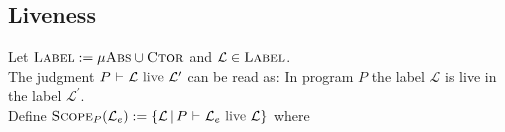 \begin{prooftree}
\end{prooftree}
\vspace*{0.3cm}

\begin{prooftree}
\end{prooftree}
\vspace*{0.3cm}

\subsection{Liveness}
Let $\textsc{Label} := \mu\textsc{Abs} \cup \textsc{Ctor}$ and $\mathcal{L} \in \textsc{Label}$.
\\
The judgment $\liveness{P}{\mathcal{L}}{\mathcal{L}^{\prime}}$ can be read as: In program $P$ the label $\mathcal{L}$ is live in the label $\mathcal{L}^{\prime}$.
\\
Define $\textsc{Scope}_{P}(\mathcal{L}_{e}) := \lbrace \mathcal{L} \,|\, \liveness{P}{\mathcal{L}_{e}}{\mathcal{L}} \rbrace$ where
\\
\begin{prooftree}
\end{prooftree}
\vspace*{0.3cm}

\begin{prooftree}
\end{prooftree}
\vspace*{0.3cm}

